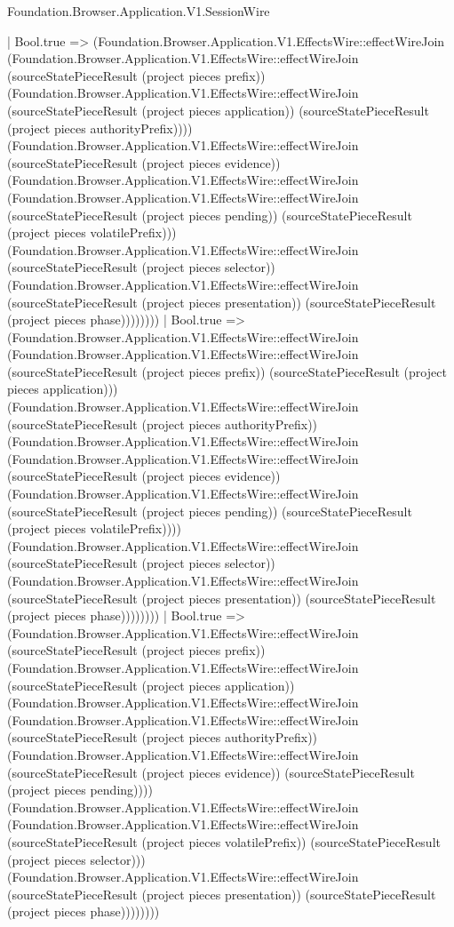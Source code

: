 \begin{lexlean}{Foundation.Browser.Application.V1.SessionWire}
\begin{semanticmodule}
{          | Bool.true => (Foundation.Browser.Application.V1.EffectsWire::effectWireJoin (Foundation.Browser.Application.V1.EffectsWire::effectWireJoin (sourceStatePieceResult (project pieces prefix)) (Foundation.Browser.Application.V1.EffectsWire::effectWireJoin (sourceStatePieceResult (project pieces application)) (sourceStatePieceResult (project pieces authorityPrefix)))) (Foundation.Browser.Application.V1.EffectsWire::effectWireJoin (sourceStatePieceResult (project pieces evidence)) (Foundation.Browser.Application.V1.EffectsWire::effectWireJoin (Foundation.Browser.Application.V1.EffectsWire::effectWireJoin (sourceStatePieceResult (project pieces pending)) (sourceStatePieceResult (project pieces volatilePrefix))) (Foundation.Browser.Application.V1.EffectsWire::effectWireJoin (sourceStatePieceResult (project pieces selector)) (Foundation.Browser.Application.V1.EffectsWire::effectWireJoin (sourceStatePieceResult (project pieces presentation)) (sourceStatePieceResult (project pieces phase))))))))
        | Bool.true => (Foundation.Browser.Application.V1.EffectsWire::effectWireJoin (Foundation.Browser.Application.V1.EffectsWire::effectWireJoin (sourceStatePieceResult (project pieces prefix)) (sourceStatePieceResult (project pieces application))) (Foundation.Browser.Application.V1.EffectsWire::effectWireJoin (sourceStatePieceResult (project pieces authorityPrefix)) (Foundation.Browser.Application.V1.EffectsWire::effectWireJoin (Foundation.Browser.Application.V1.EffectsWire::effectWireJoin (sourceStatePieceResult (project pieces evidence)) (Foundation.Browser.Application.V1.EffectsWire::effectWireJoin (sourceStatePieceResult (project pieces pending)) (sourceStatePieceResult (project pieces volatilePrefix)))) (Foundation.Browser.Application.V1.EffectsWire::effectWireJoin (sourceStatePieceResult (project pieces selector)) (Foundation.Browser.Application.V1.EffectsWire::effectWireJoin (sourceStatePieceResult (project pieces presentation)) (sourceStatePieceResult (project pieces phase))))))))
      | Bool.true => (Foundation.Browser.Application.V1.EffectsWire::effectWireJoin (sourceStatePieceResult (project pieces prefix)) (Foundation.Browser.Application.V1.EffectsWire::effectWireJoin (sourceStatePieceResult (project pieces application)) (Foundation.Browser.Application.V1.EffectsWire::effectWireJoin (Foundation.Browser.Application.V1.EffectsWire::effectWireJoin (sourceStatePieceResult (project pieces authorityPrefix)) (Foundation.Browser.Application.V1.EffectsWire::effectWireJoin (sourceStatePieceResult (project pieces evidence)) (sourceStatePieceResult (project pieces pending)))) (Foundation.Browser.Application.V1.EffectsWire::effectWireJoin (Foundation.Browser.Application.V1.EffectsWire::effectWireJoin (sourceStatePieceResult (project pieces volatilePrefix)) (sourceStatePieceResult (project pieces selector))) (Foundation.Browser.Application.V1.EffectsWire::effectWireJoin (sourceStatePieceResult (project pieces presentation)) (sourceStatePieceResult (project pieces phase))))))))
}
\end{semanticmodule}
\end{lexlean}
